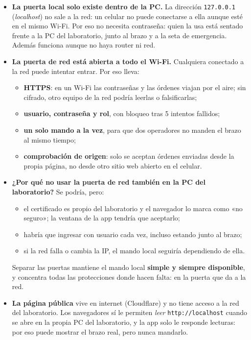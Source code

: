 \documentclass[a4paper,11pt]{article}
\newcommand{\codigo}[1]{\texttt{#1}}
\begin{document}
\begin{itemize}
\item \textbf{La puerta local solo existe dentro de la PC.} La dirección \codigo{127.0.0.1} (\emph{localhost}) no sale a la red: un celular no puede conectarse a ella aunque esté en el mismo Wi-Fi. Por eso no necesita contraseña: quien la usa está sentado frente a la PC del laboratorio, junto al brazo y a la seta de emergencia. Además funciona aunque no haya router ni red.
\item \textbf{La puerta de red está abierta a todo el Wi-Fi.} Cualquiera conectado a la red puede intentar entrar. Por eso lleva:
\begin{itemize}
\item \textbf{HTTPS}: en un Wi-Fi las contraseñas y las órdenes viajan por el aire; sin cifrado, otro equipo de la red podría leerlas o falsificarlas;
\item \textbf{usuario, contraseña y rol}, con bloqueo tras 5 intentos fallidos;
\item \textbf{un solo mando a la vez}, para que dos operadores no manden el brazo al mismo tiempo;
\item \textbf{comprobación de origen}: solo se aceptan órdenes enviadas desde la propia página, no desde otro sitio web abierto en el celular.
\end{itemize}
\item \textbf{¿Por qué no usar la puerta de red también en la PC del laboratorio?} Se podría, pero:
\begin{itemize}
\item el certificado es propio del laboratorio y el navegador lo marca como «no seguro»; la ventana de la app tendría que aceptarlo;
\item habría que ingresar con usuario cada vez, incluso estando junto al brazo;
\item si la red falla o cambia la IP, el mando local seguiría dependiendo de ella.
\end{itemize}
Separar las puertas mantiene el mando local \textbf{simple y siempre disponible}, y concentra todas las protecciones donde hacen falta: en la puerta que da a la red.
\item \textbf{La página pública} vive en internet (Cloudflare) y no tiene acceso a la red del laboratorio. Los navegadores sí le permiten \emph{leer} \codigo{http://localhost} cuando se abre en la propia PC del laboratorio, y la app solo le responde lecturas: por eso puede mostrar el brazo real, pero nunca mandarlo.
\end{itemize}
\end{document}
